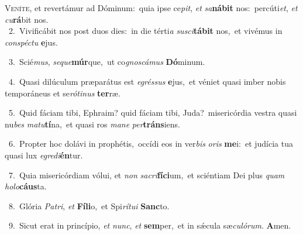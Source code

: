 \lettrine{\initial\textcolor{\initialcolor}{V}}{eníte,} et revertámur ad Dóminum:~\dagger quia ipse ce\-\textit{pit}\-, \textit{et} \textit{sa}\-\textbf{ná}\textbf{bit} nos:~\star percúti\-\textit{et}\-, \textit{et} \textit{cu}\-\textbf{rá}bit nos.\\
{\numbfont\textcolor{\numbcolor}{~2.}}~Vivificábit nos post duos dies:~\dagger in die térti\textit{a} \textit{su}\-\textit{sci}\textbf{tá}\textbf{bit} nos,~\star et vivémus in \textit{con}\-\textit{spéc}\textit{tu} \textbf{e}\-jus.\par
{\numbfont\textcolor{\numbcolor}{~3.}}~Scié\-\textit{mus}\-, \textit{se}\-\textit{que}\textbf{múr}que,~\star ut co\-\textit{gnos}\-\textit{cá}\textit{mus} \textbf{Dó}\-minum.\par
{\numbfont\textcolor{\numbcolor}{~4.}}~Quasi dilúculum præparátus est \textit{e}\-\textit{grés}\textit{sus} \textbf{e}\-jus,~\star et véniet quasi imber nobis temporáneus et se\-\textit{ró}\-\textit{ti}\textit{nus} \textbf{ter}\-ræ.\par
{\numbfont\textcolor{\numbcolor}{~5.}}~Quid fáciam tibi, Ephraim? quid fáciam tibi, Juda?~\dagger misericórdia vestra quasi nu\textit{bes} \textit{ma}\-\textit{tu}\textbf{tí}na,~\star et quasi ros \textit{ma}\-\textit{ne} \textit{per}\-\textbf{tráns}iens.\par
{\numbfont\textcolor{\numbcolor}{~6.}}~Propter hoc dolávi in prophétis,~\dagger occídi eos in ver\textit{bis} \textit{o}\-\textit{ris} \textbf{me}\-i:~\star et judícia tua quasi lux \textit{e}\-\textit{gre}\textit{di}\textbf{én}tur.\par
{\numbfont\textcolor{\numbcolor}{~7.}}~Quia misericórdiam vólui, et \textit{non} \textit{sa}\-\textit{cri}\textbf{fí}\textbf{ci}um,~\star et sciéntiam Dei plus \textit{quam} \textit{ho}\-\textit{lo}\textbf{cáus}ta.\par
{\numbfont\textcolor{\numbcolor}{~8.}}~Glória \textit{Pa}\-\textit{tri}, \textit{et} \textbf{Fí}\-\textbf{li}o,~\star et Spi\-\textit{rí}\-\textit{tu}\textit{i} \textbf{Sanc}\-to.\par
{\numbfont\textcolor{\numbcolor}{~9.}}~Sicut erat in princípio, \textit{et} \textit{nunc}\-, \textit{et} \textbf{sem}\-per,~\star et in sǽcula sæ\-\textit{cu}\-\textit{ló}\textit{rum}. \textbf{A}\-men.\par

